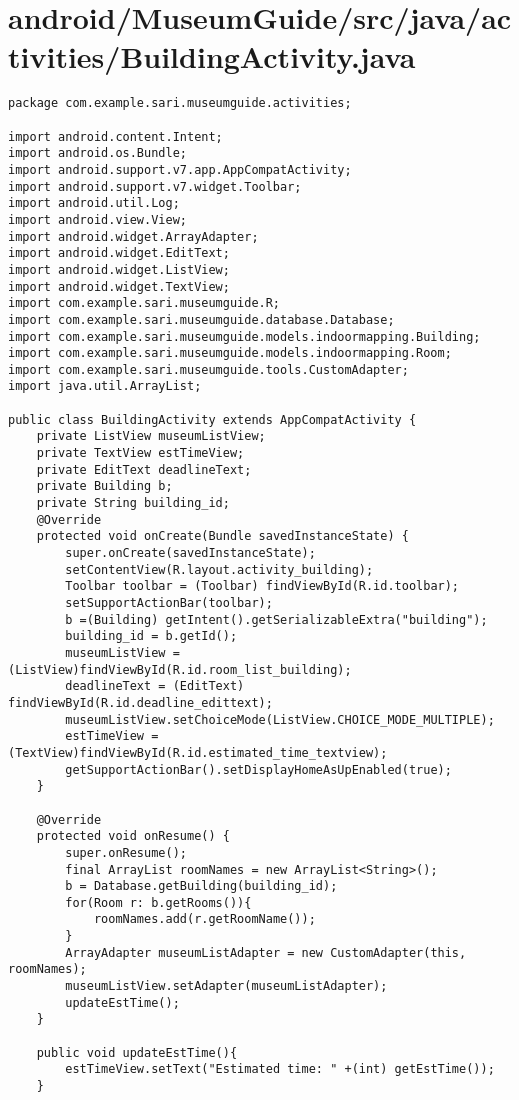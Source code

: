 \section{android/MuseumGuide/src/java/activities/BuildingActivity.java}
\begin{lstlisting}package com.example.sari.museumguide.activities;

import android.content.Intent;
import android.os.Bundle;
import android.support.v7.app.AppCompatActivity;
import android.support.v7.widget.Toolbar;
import android.util.Log;
import android.view.View;
import android.widget.ArrayAdapter;
import android.widget.EditText;
import android.widget.ListView;
import android.widget.TextView;
import com.example.sari.museumguide.R;
import com.example.sari.museumguide.database.Database;
import com.example.sari.museumguide.models.indoormapping.Building;
import com.example.sari.museumguide.models.indoormapping.Room;
import com.example.sari.museumguide.tools.CustomAdapter;
import java.util.ArrayList;

public class BuildingActivity extends AppCompatActivity {
    private ListView museumListView;
    private TextView estTimeView;
    private EditText deadlineText;
    private Building b;
    private String building_id;
    @Override
    protected void onCreate(Bundle savedInstanceState) {
        super.onCreate(savedInstanceState);
        setContentView(R.layout.activity_building);
        Toolbar toolbar = (Toolbar) findViewById(R.id.toolbar);
        setSupportActionBar(toolbar);
        b =(Building) getIntent().getSerializableExtra("building");
        building_id = b.getId();
        museumListView = (ListView)findViewById(R.id.room_list_building);
        deadlineText = (EditText) findViewById(R.id.deadline_edittext);
        museumListView.setChoiceMode(ListView.CHOICE_MODE_MULTIPLE);
        estTimeView = (TextView)findViewById(R.id.estimated_time_textview);
        getSupportActionBar().setDisplayHomeAsUpEnabled(true);
    }

    @Override
    protected void onResume() {
        super.onResume();
        final ArrayList roomNames = new ArrayList<String>();
        b = Database.getBuilding(building_id);
        for(Room r: b.getRooms()){
            roomNames.add(r.getRoomName());
        }
        ArrayAdapter museumListAdapter = new CustomAdapter(this, roomNames);
        museumListView.setAdapter(museumListAdapter);
        updateEstTime();
    }

    public void updateEstTime(){
        estTimeView.setText("Estimated time: " +(int) getEstTime());
    }


\end{lstlisting}
